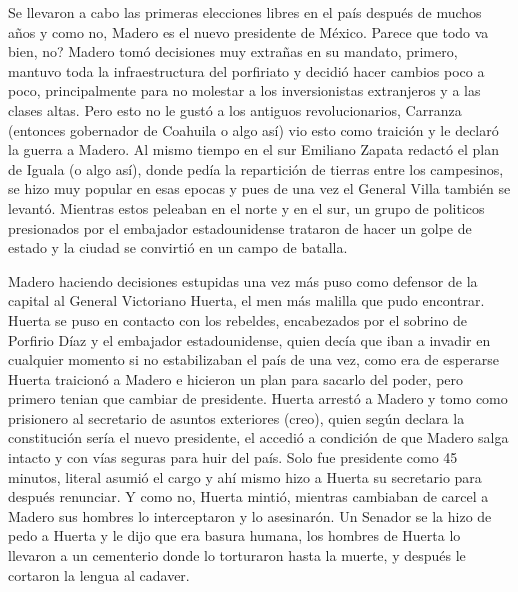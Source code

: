 \documentclass{article}
\begin{document}
Se llevaron a cabo las primeras elecciones libres en el país después de muchos años y como no, Madero es el nuevo presidente de México.
Parece que todo va bien, no? Madero tomó decisiones muy extrañas en su mandato, primero, mantuvo toda la infraestructura del porfiriato y decidió hacer
cambios poco a poco, principalmente para no molestar a los inversionistas extranjeros y a las clases altas. Pero esto no le gustó a los
antiguos revolucionarios, Carranza (entonces gobernador de Coahuila o algo así) vio esto como traición y le declaró la guerra a Madero.
Al mismo tiempo en el sur Emiliano Zapata redactó el plan de Iguala (o algo así), donde pedía la repartición de tierras
entre los campesinos, se hizo muy popular en esas epocas y pues de una vez el General Villa también se levantó.
Mientras estos peleaban en el norte y en el sur, un grupo de politicos presionados por el embajador
estadounidense trataron de hacer un golpe de estado y la ciudad se convirtió en un campo de batalla.

Madero haciendo decisiones estupidas una vez más puso como defensor de la capital al General Victoriano Huerta, el men más malilla que pudo encontrar.
Huerta se puso en contacto con los rebeldes, encabezados por el sobrino de Porfirio Díaz y el embajador estadounidense, quien decía
que iban a invadir en cualquier momento si no estabilizaban el país de una vez, como era de esperarse Huerta traicionó a Madero e
hicieron un plan para sacarlo del poder, pero primero tenian que cambiar de presidente. Huerta arrestó a Madero y tomo como prisionero
al secretario de asuntos exteriores (creo), quien según declara la constitución sería el nuevo presidente, el accedió a condición de
que Madero salga intacto y con vías seguras para huir del país.
Solo fue presidente como 45 minutos, literal asumió el cargo y ahí mismo hizo a Huerta su secretario para después renunciar.
Y como no, Huerta mintió, mientras cambiaban de carcel a Madero sus hombres lo interceptaron y lo asesinarón.
Un Senador se la hizo de pedo a Huerta y le dijo que era basura humana, los hombres de Huerta lo llevaron a un
cementerio donde lo torturaron hasta la muerte, y después le cortaron la lengua al cadaver.
\end{document}
